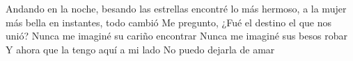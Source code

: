     Andando en la noche, besando las estrellas
    encontré lo más hermoso, a la mujer más bella
    en instantes, todo cambió
    Me pregunto, ¿Fué el destino el que nos unió?
    Nunca me imaginé su cariño encontrar
    Nunca me imaginé sus besos robar
    Y ahora que la tengo aquí a mi lado
    No puedo dejarla de amar
\endchorus